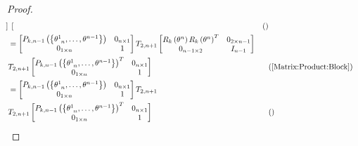 \documentclass[../main.tex]{subfiles}
\begin{document}
\begin{proof}
\begin{align*}
\begin{bmatrix}
        \end{bmatrix} && \text{()} \\
        &=
        \begin{bmatrix}
            P_{k,n-1}\left(\left\{\tensor{\theta}{^1_{n}},\dots,\tensor{\theta}{^{n-1}}\right\}\right) & 0_{n\times 1} \\
            0_{1\times n}                                                                              & 1             \\
        \end{bmatrix}
        T_{2,n+1}
        \begin{bmatrix}
            R_k\left(\tensor{\theta}{^n}\right)R_k\left(\tensor{\theta}{^n}\right)^T & 0_{{2}\times{n-1}} \\
            0_{{n-1}\times{2}}                  & {I}_{n-1}          \\
        \end{bmatrix}\\
        &
        T_{2,n+1}
        \begin{bmatrix}
            P_{k,n-1}\left(\left\{\tensor{\theta}{^1_{n}},\dots,\tensor{\theta}{^{n-1}}\right\}\right)^T & 0_{n\times 1} \\
            0_{1\times n}                                                                              & 1             \\
        \end{bmatrix} && \text{(\cref{Matrix:Product:Block})} \\
        &=
        \begin{bmatrix}
            P_{k,n-1}\left(\left\{\tensor{\theta}{^1_{n}},\dots,\tensor{\theta}{^{n-1}}\right\}\right) & 0_{n\times 1} \\
            0_{1\times n}                                                                              & 1             \\
        \end{bmatrix}
        T_{2,n+1}\\
        &
        T_{2,n+1}
        \begin{bmatrix}
            P_{k,n-1}\left(\left\{\tensor{\theta}{^1_{n}},\dots,\tensor{\theta}{^{n-1}}\right\}\right)^T & 0_{n\times 1} \\
            0_{1\times n}                                                                              & 1             \\
        \end{bmatrix} && \text{()} \\

\end{align*}
\end{proof}
\end{document}
